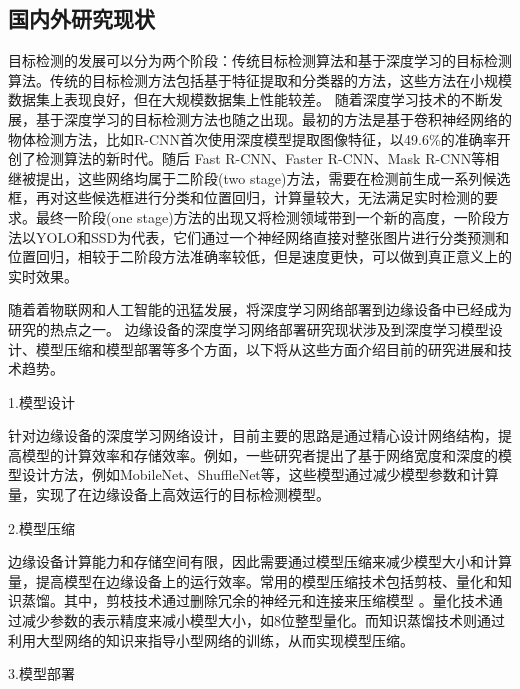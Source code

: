 \documentclass{ctexart}
\numberwithin{equation}{section}%
\numberwithin{figure}{section}%
\numberwithin{table}{section}%
\begin{document}
	\subsection{国内外研究现状}
	目标检测的发展可以分为两个阶段：传统目标检测算法和基于深度学习的目标检测算法。传统的目标检测方法包括基于特征提取和分类器的方法，这些方法在小规模数据集上表现良好，但在大规模数据集上性能较差。
	随着深度学习技术的不断发展，基于深度学习的目标检测方法也随之出现。最初的方法是基于卷积神经网络的物体检测方法，比如R-CNN\textsuperscript{\cite{article2}}首次使用深度模型提取图像特征，以49.6\%的准确率开创了检测算法的新时代。随后 Fast R-CNN\textsuperscript{\cite{article3}}、Faster R-CNN\textsuperscript{\cite{article4}}、Mask R-CNN\textsuperscript{\cite{article5}}等相继被提出，这些网络均属于二阶段(two stage)方法，需要在检测前生成一系列候选框，再对这些候选框进行分类和位置回归，计算量较大，无法满足实时检测的要求。最终一阶段(one stage)方法的出现又将检测领域带到一个新的高度，一阶段方法以YOLO\textsuperscript{\cite{article6}}\textsuperscript{\cite{article7}}\textsuperscript{\cite{article8}}和SSD\textsuperscript{\cite{article9}}为代表，它们通过一个神经网络直接对整张图片进行分类预测和位置回归，相较于二阶段方法准确率较低，但是速度更快，可以做到真正意义上的实时效果。
	
	随着着物联网和人工智能的迅猛发展，将深度学习网络部署到边缘设备中已经成为研究的热点之一。
	边缘设备的深度学习网络部署研究现状涉及到深度学习模型设计、模型压缩和模型部署等多个方面，以下将从这些方面介绍目前的研究进展和技术趋势。
	
	1.模型设计
	
	针对边缘设备的深度学习网络设计，目前主要的思路是通过精心设计网络结构，提高模型的计算效率和存储效率。例如，一些研究者提出了基于网络宽度和深度的模型设计方法，例如MobileNet\textsuperscript{\cite{6}}、ShuffleNet\textsuperscript{\cite{7}}等，这些模型通过减少模型参数和计算量，实现了在边缘设备上高效运行的目标检测模型。
	
	2.模型压缩
	
	边缘设备计算能力和存储空间有限，因此需要通过模型压缩来减少模型大小和计算量，提高模型在边缘设备上的运行效率。常用的模型压缩技术包括剪枝、量化和知识蒸馏。其中，剪枝技术通过删除冗余的神经元和连接来压缩模型 \textsuperscript{\cite{8}}。量化技术通过减少参数的表示精度来减小模型大小，如8位整型量化\textsuperscript{\cite{9}}。而知识蒸馏技术则通过利用大型网络的知识来指导小型网络的训练，从而实现模型压缩\textsuperscript{\cite{10}}。
	
	3.模型部署
	
\end{document}
